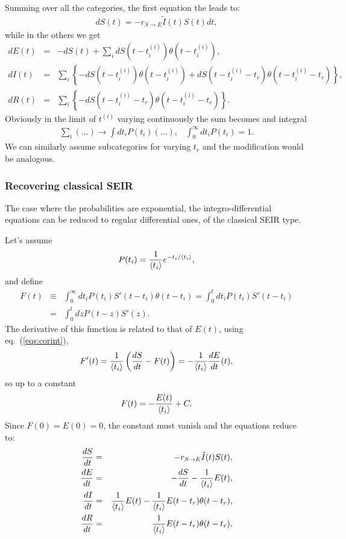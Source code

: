 \documentclass[a4paper,oneside,11pt]{article}
\begin{document}
Summing over all the categories, the first equation the leads to:
\begin{eqnarray}
d S(t) = - r_{S\rightarrow E} \tilde{I}(t) S(t) dt, 
\end{eqnarray}
while in the others we get
\begin{eqnarray}
d E(t) &=& -d S(t) + \sum_i d S(t-t^{(i)}_i) \theta(t-t^{(i)}_i) ,\nonumber\\
d I(t) &=& \sum_i  \left\{-d S(t-t^{(i)}_i) \theta(t-t^{(i)}_i)+ d S(t-t^{(i)}_i-t_r) \theta(t-t^{(i)}_i-t_r)\right\},\nonumber\\
d R(t) &=& \sum_i \left\{- d S(t - t^{(i)}_i - t_r) \theta(t-t^{(i)}_i-t_r)\right\}.\nonumber
\label{eqs:corint}
\end{eqnarray}
Obviously in the limit of $t^{(i)}$ varying continuously the sum becomes and integral
\begin{eqnarray}
\sum_i  (...) \rightarrow \int dt_i P(t_i) (...), \;\;\; \int_0^\infty dt_i P(t_i) = 1.
\end{eqnarray}
We can similarly assume subcategories for varying $t_r$ and the modification would be analogous. 

\subsubsection{Recovering classical SEIR}

The case where the probabilities are exponential, the integro-differential equations can be reduced to regular differential ones, of the classical SEIR type.

 Let's assume 
\begin{eqnarray}
P(t_i) = {1\over \langle t_i\rangle} e^{-t_i/\langle t_i\rangle},
\end{eqnarray}
and define
\begin{eqnarray}
F(t) &\equiv& \int_0^\infty dt_iP(t_i) S'(t-t_i) \theta(t-t_i) = \int_0^t dt_i P(t_i)  S'(t-t_i) \nonumber\\
&=& \int_0^t dz P(t-z) S'(z).
\end{eqnarray}
The derivative of this function is related to that of $E(t)$, using eq.~(\ref{eqs:corint}), 
\begin{eqnarray}
F'(t) = {1\over \langle t_i\rangle} \left({d S\over dt}-F(t)\right) = - {1\over \langle t_i\rangle} {dE\over d t}(t), 
\end{eqnarray}
so up to a constant 
\begin{eqnarray}
F(t) = -{E(t)\over \langle t_i\rangle} +C.
\end{eqnarray}
Since $F(0) = E(0) =0$, the constant must vanish and the equations reduce to:
\begin{eqnarray}
{d S\over dt} &=& - r_{S\rightarrow E} \tilde{I}(t) S(t),\nonumber\\ 
{d E\over dt} &=& -{d S\over d t} - {1 \over \langle t_i\rangle} E(t) ,\nonumber\\
{d I\over dt} &=& {1 \over \langle t_i\rangle} E(t) -{1\over \langle t_i\rangle} E(t-t_r) \theta(t-t_r),\nonumber\\
{d R\over d t} &=&  {1\over  \langle t_i\rangle} E(t-t_r) \theta(t-t_r),\nonumber\\
\end{eqnarray}
\end{document}
